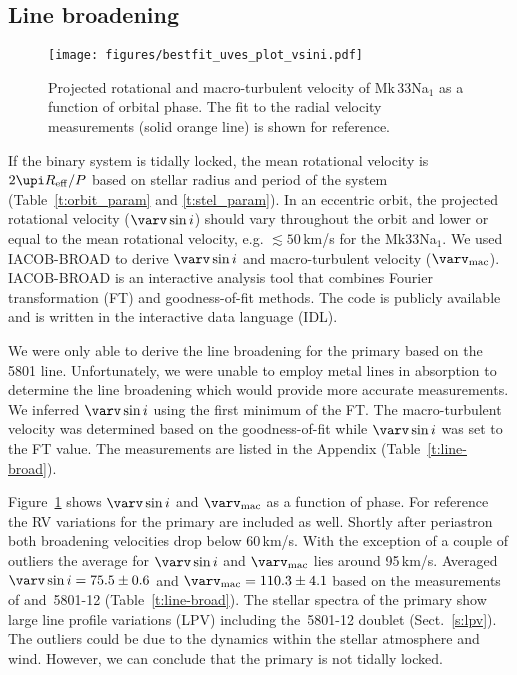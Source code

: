 \documentclass[fleqn,usenatbib]{mnras}
\begin{document}
\subsection{Line broadening}
\label{s:lb}
\begin{figure}
	\texttt{[image: figures/bestfit\_uves\_plot\_vsini.pdf]}
    \caption{Projected rotational and macro-turbulent velocity of Mk\,33Na$_1$ as a function of orbital phase. The fit to the radial velocity measurements (solid orange line) is shown for reference.}  
    \label{f:vsini}
\end{figure}

If the binary system is tidally locked, the mean rotational velocity is $2\upi R_{\rm eff}/P$ based on stellar radius and period of the system (Table~\ref{t:orbit_param} and \ref{t:stel_param}). In an eccentric orbit, the projected rotational velocity ($\varv \sin i$) should vary throughout the orbit and lower or equal to the mean rotational velocity, e.g. $\lesssim 50$\,km/s for the Mk33Na$_1$. We used IACOB-BROAD \citep{simon-diaz2014} to derive $\varv \sin i$ and macro-turbulent velocity ($\varv_{\rm mac}$). IACOB-BROAD is an interactive analysis tool that combines Fourier transformation (FT) and goodness-of-fit methods. The code is publicly available and is written in the interactive data language (IDL).

We were only able to derive the line broadening for the primary based on the \,5801 line. Unfortunately, we were unable to employ metal lines in absorption to determine the line broadening which would provide more accurate measurements. We inferred $\varv \sin i$ using the first minimum of the FT. The macro-turbulent velocity was determined based on the goodness-of-fit while $\varv \sin i$ was set to the FT value. The measurements are listed in the Appendix (Table~\ref{t:line-broad}).

Figure~\ref{f:vsini} shows $\varv \sin i$ and $\varv_{\rm mac}$ as a function of phase. For reference the RV variations for the primary are included as well. Shortly after periastron both broadening velocities drop below 60\,km/s. With the exception of a couple of outliers the average for $\varv \sin i$ and $\varv_{\rm mac}$ lies around 95\,km/s. Averaged $\varv \sin i = 75.5\pm 0.6$ and $\varv_{\rm mac} = 110.3\pm4.1$ based on the measurements of  and \,5801-12 (Table~\ref{t:line-broad}). The stellar spectra of the primary show large line profile variations (LPV) including the \,5801-12 doublet (Sect.~\ref{s:lpv}). The outliers could be due to the dynamics within the stellar atmosphere and wind. However, we can conclude that the primary is not tidally locked.
\end{document}
